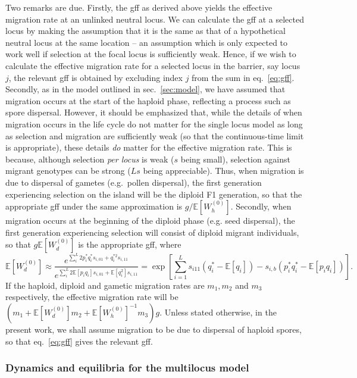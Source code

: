 \documentclass[
  11pt,
]{article}
\begin{document}
Two remarks are due. Firstly, the gff as derived above yields the
effective migration rate at an unlinked neutral locus. We can calculate
the gff at a selected locus by making the assumption that it is the same
as that of a hypothetical neutral locus at the same location -- an
assumption which is only expected to work well if selection at the focal
locus is sufficiently weak. Hence, if we wish to calculate the effective
migration rate for a selected locus in the barrier, say locus \(j\), the
relevant gff is obtained by excluding index \(j\) from the sum in
eq.~\ref{eq:gff}. Secondly, as in the model outlined in
sec.~\ref{sec:model}, we have assumed that migration occurs at the start
of the haploid phase, reflecting a process such as spore dispersal.
However, it should be emphasized that, while the details of when
migration occurs in the life cycle do not matter for the single locus
model as long as selection and migration are sufficiently weak (so that
the continuous-time limit is appropriate), these details \emph{do}
matter for the effective migration rate. This is because, although
selection \emph{per locus} is weak (\(s\) being small), selection
against migrant genotypes can be strong (\(Ls\) being appreciable).
Thus, when migration is due to dispersal of gametes (e.g.~pollen
dispersal), the first generation experiencing selection on the island
will be the diploid F1 generation, so that the appropriate gff under the
same approximation is \(g/\mathbb{E}[W_h^{(0)}]\). Secondly, when
migration occurs at the beginning of the diploid phase (e.g. seed
dispersal), the first generation experiencing selection will consist of
diploid migrant individuals, so that \(g\mathbb{E}[W_d^{(0)}]\) is the
appropriate gff, where \begin{equation*}
  \mathbb{E}[W_d^{(0)}] \approx
    \frac{e^{\sum_i^L 2p_i^{\ast}q_i^{\ast}s_{i,01} + q_i^{\ast 2}
        s_{i,11}}}{e^{\sum_i^L2\mathbb{E}[p_iq_i]s_{i,01} + \mathbb{E}[q_i^2]s_{i,11}}}
    = \exp\left[\sum_{i=1}^Ls_{i11}(q_{i}^\ast - \mathbb{E}[q_i]) - 
    s_{i,b}(p_i^\ast q_i^{\ast} - \mathbb{E}[p_iq_i])\right].
\end{equation*} If the haploid, diploid and gametic migration rates are
\(m_1, m_2\) and \(m_3\) respectively, the effective migration rate will
be
\((m_1 + \mathbb{E}[W_d^{(0)}] m_2 + \mathbb{E}[W_h^{(0)}]^{-1}m_3)g\).
Unless stated otherwise, in the present work, we shall assume migration
to be due to dispersal of haploid spores, so that eq.~\ref{eq:gff} gives
the relevant gff.

\hypertarget{sec:dynamics}{%
\subsubsection{Dynamics and equilibria for the multilocus
model}\label{sec:dynamics}}
\end{document}
